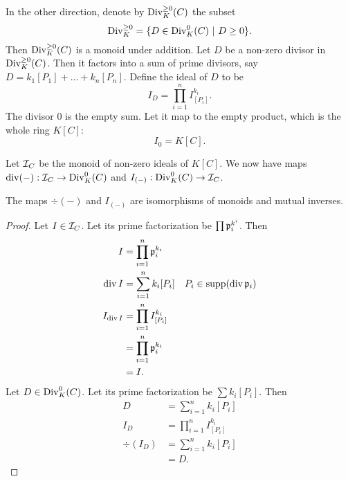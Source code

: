 In the other direction, denote by $\Div_K^{\geq 0}(C)$ the subset
  \[ \Div_K^{\geq 0} = \{ D \in \Div_K^0(C) ~|~ D \geq 0 \}. \]
Then $\Div_K^{\geq 0}(C)$ is a monoid under addition.
Let $D$ be a non-zero divisor in $\Div_K^{\geq 0}(C)$.
Then it factors into a sum of prime divisors, say $D = k_1[P_1] + \dots + k_n[P_n]$.
Define the ideal of $D$ to be
\[ I_D = \prod_{i=1}^n I_{[P_i]}^{k_i}. \]
The divisor 0 is the empty sum.
Let it map to the empty product, which is the whole ring $K[C]$:
\[ I_{0} = K[C]. \]

Let $\cal I_C$ be the monoid of non-zero ideals of $K[C]$.
We now have maps $\div(-) : \cal I_C \to \Div_K^0(C)$ and $I_{(-)} : \Div_K^0(C) \to \cal I_C$.
\begin{theorem}
  The maps $\div(-)$ and $I_{(-)}$ are isomorphisms of monoids and mutual inverses.
\end{theorem}
\begin{proof}
  Let $I \in \cal I_C$. Let its prime factorization be $\prod \frak p_i^{k^i}$. Then
  \begin{align*}
    I &= \prod_{i=1}^n \frak p_i^{k_i} \\
    \div I &= \sum_{i=1}^n k_i[P_i]
      & P_i \in \supp(\div \frak p_i) \\
    I_{\div I} &= \prod_{i=1}^n I_{[P_i]}^{k_i} \\
               &= \prod_{i=1}^n \frak p_i^{k_i} \\
               &= I.
  \end{align*}
  Let $D \in \Div_K^0(C)$. Let its prime factorization be $\sum k_i[P_i]$. Then
  \begin{align*}
    D &= \sum_{i=1}^n k_i[P_i] \\
    I_D &= \prod_{i=1}^n I_{[P_i]}^{k_i} \\
    \div(I_D) &= \sum_{i=1}^n k_i [P_i] \\ &= D.
  \end{align*}
\end{proof}
\begin{comment}
\begin{proof}
  The proof is quite immediate after factoring each ideal.
  It has already been established that $\div$ maps the identity $K[C]$ of $\cal I_C$ to the identity $0$ of $\Div_K^0(C)$.
  Let $\frak a$ and $\frak b$ be non-zero ideals with prime factorizations
  \[ \frak a = \prod \frak p_i^{k_i}, ~~~ \frak b = \prod \frak q_i^{\ell_i}. \]
  Then
  \begin{align*}
    \div (\frak a \frak b)
      &= \div \left( \left( \prod \frak p_i^{k_i} \right) \left( \prod \frak q_j^{\ell_j} \right) \right) \\
      &= \sum k_i \div \frak p_i + \sum \ell_j \div \frak q_i \\
      &= \div \frak a + \div \frak b.
  \end{align*}
\end{proof}
\end{comment}



